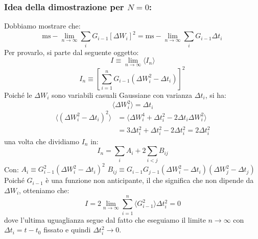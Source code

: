 \subsubsection{Idea della dimostrazione per $N=0$:}
Dobbiamo mostrare che:
\begin{equation}
\text{ms}-\lim_{n\rightarrow\infty} \sum_i G_{i-1}[\Delta W_i]^2 = \text{ms}-\lim_{n\rightarrow\infty} \sum_i G_{i-1}\Delta t_i \,
\end{equation}
Per provarlo, si parte dal seguente oggetto:
\begin{equation}
I \equiv \lim_{n\rightarrow\infty} \langle I_n \rangle
\end{equation}
\begin{equation}
I_n \equiv \left[ \sum_{i=1}^n G_{i-1}(\Delta W_i^2 - \Delta t_i) \right]^2 \,
\end{equation}
Poiché le $\Delta W_i$ sono variabili casuali Gaussiane con varianza $\Delta t_i$, si ha:
\begin{equation}
\langle \Delta W_i^2 \rangle = \Delta t_i
\end{equation}
\begin{equation} 
\begin{aligned}
\langle (\Delta W_i^2 - \Delta t_i)^2 \rangle &= \langle \Delta W_i^4 + \Delta t_i^2 - 2\Delta t_i \Delta W_i^2 \rangle \\ &= 3\Delta t_i^2 + \Delta t_i^2 - 2\Delta t_i^2 = 2\Delta t_i^2 \end{aligned}
\end{equation}
una volta che dividiamo $I_n$ in:
\begin{equation}
I_n = \sum_i A_i + 2 \sum_{i<j} B_{ij}
\end{equation}
Con:
$A_i \equiv G_{i-1}^2 (\Delta W_i^2 - \Delta t_i)^2$
$B_{ij} \equiv G_{i-1}G_{j-1}(\Delta W_i^2 - \Delta t_i)(\Delta W_j^2 - \Delta t_j) \,$
Poiché $G_{i-1}$ è una funzione non anticipante, il che significa che non dipende da $\Delta W_i$, otteniamo che:
\begin{equation}
I = 2 \lim_{n\rightarrow\infty} \sum_{i=1}^n \langle G_{i-1}^2 \rangle \Delta t_i^2 = 0
\end{equation}
dove l'ultima uguaglianza segue dal fatto che eseguiamo il limite $n\rightarrow\infty$ con $\Delta t_i  = t - t_0$ fissato e quindi $\Delta t_i^2 \rightarrow 0$.

